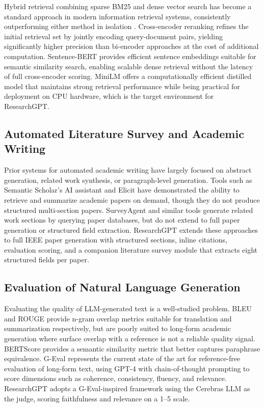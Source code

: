 \documentclass[12pt, a4paper]{article}
\begin{document}
Hybrid retrieval combining sparse BM25 and dense vector search has become a
standard approach in modern information retrieval systems, consistently outperforming
either method in isolation \cite{karpukhin2020}. Cross-encoder
reranking \cite{nogueira2019} refines the initial retrieval set by jointly encoding
query-document pairs, yielding significantly higher precision than bi-encoder
approaches at the cost of additional computation. Sentence-BERT \cite{reimers2019}
provides efficient sentence embeddings suitable for semantic similarity search,
enabling scalable dense retrieval without the latency of full cross-encoder scoring.
MiniLM \cite{wang2020} offers a computationally efficient distilled model that
maintains strong retrieval performance while being practical for deployment on
CPU hardware, which is the target environment for ResearchGPT.

\subsection{Automated Literature Survey and Academic Writing}

Prior systems for automated academic writing have largely focused on abstract
generation, related work synthesis, or paragraph-level generation. Tools such as
Semantic Scholar's AI assistant and Elicit have demonstrated the ability to retrieve
and summarize academic papers on demand, though they do not produce structured
multi-section papers. SurveyAgent and similar tools generate related work sections
by querying paper databases, but do not extend to full paper generation or structured
field extraction. ResearchGPT extends these approaches to full IEEE paper generation
with structured sections, inline citations, evaluation scoring, and a companion
literature survey module that extracts eight structured fields per paper.

\subsection{Evaluation of Natural Language Generation}

Evaluating the quality of LLM-generated text is a well-studied problem. BLEU and
ROUGE provide n-gram overlap metrics suitable for translation and summarization
respectively, but are poorly suited to long-form academic generation where surface
overlap with a reference is not a reliable quality signal. BERTScore \cite{zhang2020} provides a semantic similarity
metric that better captures paraphrase equivalence. G-Eval \cite{liu2023}
represents the current state of the art for reference-free evaluation of long-form
text, using GPT-4 with chain-of-thought prompting to score dimensions such as
coherence, consistency, fluency, and relevance. ResearchGPT adopts a G-Eval-inspired
framework using the Cerebras LLM as the judge, scoring faithfulness and relevance
on a 1--5 scale.
\end{document}
